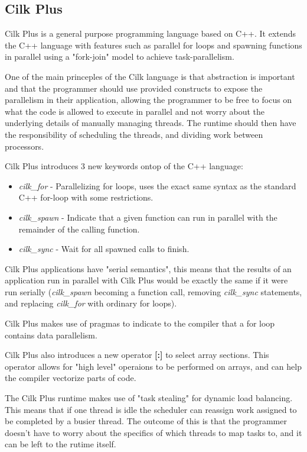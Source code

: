 \subsection{Cilk Plus}

Cilk Plus is a general purpose programming language based on C++. It extends the C++ language with features such as
parallel for loops and spawning functions in parallel using a "fork-join" model to achieve task-parallelism.

One of the main princeples of the Cilk language is that abstraction is important and that the programmer should use provided constructs to expose 
the parallelism in their application, allowing the programmer to be free to focus on what the code is allowed to execute in parallel and not worry about the underlying details of manually managing threads. The runtime should then have the responsibility of scheduling the threads, and dividing work between
processors.\cite{cilkfaq} 

Cilk Plus introduces 3 new keywords ontop of the C++ language\cite{cilk}: 
\begin{itemize}
    \item \textit{cilk\_for} - Parallelizing for loops, uses the exact same syntax as the standard C++ for-loop
                             with some restrictions.
    \item \textit{cilk\_spawn} - Indicate that a given function can run in parallel with the remainder
                              of the calling function. 
    \item \textit{cilk\_sync} - Wait for all spawned calls to finish.
\end{itemize}

Cilk Plus applications have "serial semantics"\cite{cilk}, this means that the results of an application run
in parallel with Cilk Plus would be exactly the same if it were run
serially (\textit{cilk\_spawn} becoming a function call, removing \textit{cilk\_sync} statements, 
and replacing \textit{cilk\_for} with ordinary for loops).

Cilk Plus makes use of pragmas to indicate to the compiler that a for loop contains data parallelism.\cite{cilkfaq}

Cilk Plus also introduces a new operator \textbf{[:]} to select array sections\cite{cilkarray}. This operator
allows for "high level" operaions to be performed on arrays, and can help the compiler vectorize parts of code.

The Cilk Plus runtime makes use of "task stealing" for dynamic load balancing\cite{cilkfaq}. This 
means that if one thread is idle the scheduler can reassign work assigned to be completed by a busier thread. 
The outcome of this is that the programmer doesn't have to worry about the specifics of which threads
to map tasks to, and it can be left to the rutime itself.


